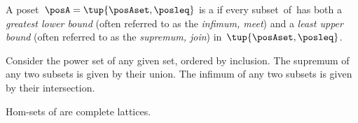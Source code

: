 \begin{definition}
    \label{def:complete-lattice}
    A poset~$\posA=\tup{\posAset,\posleq}$ is a \emph{} if every subset~\posB of~\posA has both a \emph{greatest lower bound} (often referred to as the \emph{infimum, meet}) and a \emph{least upper bound} (often referred to as the \emph{supremum, join}) in~$\tup{\posAset, \posleq}$.
\end{definition}

\begin{example}
    Consider the power set of any given set, ordered by inclusion.
    The supremum of any two subsets is given by their union.
    The infimum of any two subsets is given by their intersection.
\end{example}

\begin{lemma}
    \label{lem:DP-homsets-complete-lattice}
    Hom-sets of \DP are complete lattices.
\end{lemma}

